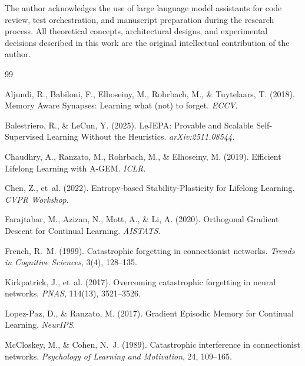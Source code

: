 \documentclass[11pt,a4paper]{article}
\begin{document}
The author acknowledges the use of large language model assistants for code review, test orchestration, and manuscript preparation during the research process. All theoretical concepts, architectural designs, and experimental decisions described in this work are the original intellectual contribution of the author.



\begin{thebibliography}{99}

Aljundi, R., Babiloni, F., Elhoseiny, M., Rohrbach, M., \& Tuytelaars, T. (2018).
\newblock Memory Aware Synapses: Learning what (not) to forget.
\newblock \emph{ECCV}.

Balestriero, R., \& LeCun, Y. (2025).
\newblock LeJEPA: Provable and Scalable Self-Supervised Learning Without the Heuristics.
\newblock \emph{arXiv:2511.08544}.

Chaudhry, A., Ranzato, M., Rohrbach, M., \& Elhoseiny, M. (2019).
\newblock Efficient Lifelong Learning with A-GEM.
\newblock \emph{ICLR}.

Chen, Z., et~al. (2022).
\newblock Entropy-based Stability-Plasticity for Lifelong Learning.
\newblock \emph{CVPR Workshop}.

Farajtabar, M., Azizan, N., Mott, A., \& Li, A. (2020).
\newblock Orthogonal Gradient Descent for Continual Learning.
\newblock \emph{AISTATS}.

French, R.~M. (1999).
\newblock Catastrophic forgetting in connectionist networks.
\newblock \emph{Trends in Cognitive Sciences}, 3(4), 128--135.

Kirkpatrick, J., et~al. (2017).
\newblock Overcoming catastrophic forgetting in neural networks.
\newblock \emph{PNAS}, 114(13), 3521--3526.

Lopez-Paz, D., \& Ranzato, M. (2017).
\newblock Gradient Episodic Memory for Continual Learning.
\newblock \emph{NeurIPS}.

McCloskey, M., \& Cohen, N.~J. (1989).
\newblock Catastrophic interference in connectionist networks.
\newblock \emph{Psychology of Learning and Motivation}, 24, 109--165.


\end{thebibliography}
\end{document}
